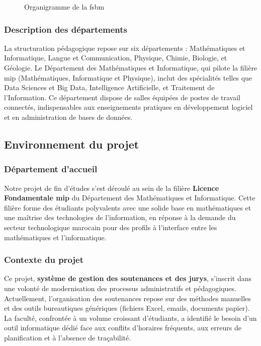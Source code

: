 \begin{figure}[H]
    \centering
    
    \caption{Organigramme de la \acrshort{fsbm}}
    \label{fig:organigramme}
\end{figure}

\subsubsection{Description des départements}
\label{ch1:departements}

La structuration pédagogique repose sur six départements : Mathématiques et Informatique, Langue et Communication, Physique, Chimie, Biologie, et Géologie. Le Département des Mathématiques et Informatique, qui pilote la filière \acrshort{mip} (Mathématiques, Informatique et Physique), inclut des spécialités telles que Data Sciences et Big Data, Intelligence Artificielle, et Traitement de l'Information. Ce département dispose de salles équipées de postes de travail connectés, indispensables aux enseignements pratiques en développement logiciel et en administration de bases de données.

\subsection{Environnement du projet}
\label{ch1:environnement}

\subsubsection{Département d'accueil}
\label{ch1:equipe}

Notre projet de fin d'études s'est déroulé au sein de la filière \textbf{Licence Fondamentale \acrshort{mip}} du Département des Mathématiques et Informatique. Cette filière forme des étudiants polyvalents avec une solide base en mathématiques et une maîtrise des technologies de l'information, en réponse à la demande du secteur technologique marocain pour des profils à l'interface entre les mathématiques et l'informatique.

\subsubsection{Contexte du projet}
\label{ch1:contexte_projet}

Ce projet, \textbf{système de gestion des soutenances et des jurys}, s'inscrit dans une volonté de modernisation des processus administratifs et pédagogiques. Actuellement, l'organisation des soutenances repose sur des méthodes manuelles et des outils bureautiques génériques (fichiers Excel, emails, documents papier). La faculté, confrontée à un volume croissant d'étudiants, a identifié le besoin d'un outil informatique dédié face aux conflits d'horaires fréquents, aux erreurs de planification et à l'absence de traçabilité.

